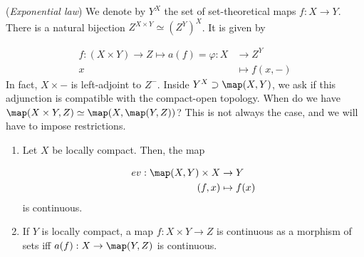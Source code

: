 \documentclass[main.tex]{subfiles}
\begin{document}
\begin{reminder}
	(\emph{Exponential law}) We denote by \(Y^X \) the set of set-theoretical maps \(f: X \to Y\).
	There is a natural bijection \(Z^{X \times Y} \simeq {\left(Z^{Y}\right)}^X \).
	It is given by
	
\begin{align*}
		f: (X \times Y) \to Z \mapsto a(f) = \varphi: X & \to Z^Y \\
		x & \mapsto f(x, -)
	
\end{align*}
	In fact, \(X \times -\) is left-adjoint to \(Z^- \).
	Inside \(Y^X \supset \map(X,Y)\), we ask if this adjunction is compatible with the compact-open topology.
	When do we have \(\map(X \times Y, Z) \simeq \map(X, \map(Y,Z))\)?
	This is not always the case, and we will have to impose restrictions.
\end{reminder}

\begin{prop}
	
\begin{enumerate}
		\item Let \(X\) be locally compact.
		 Then, the map
		
\begin{align*}
			 ev: \map(X,Y) \times X & \to Y \\
			 (f, x) & \mapsto f(x)
		
\end{align*}
		 is continuous.

		\item If \(Y\) is locally compact, a map \(f: X \times Y \to Z\) is continuous as a morphism of sets iff \(a(f): X \to \map(Y,Z)\) is continuous.
	
\end{enumerate}
\end{prop}
\end{document}
